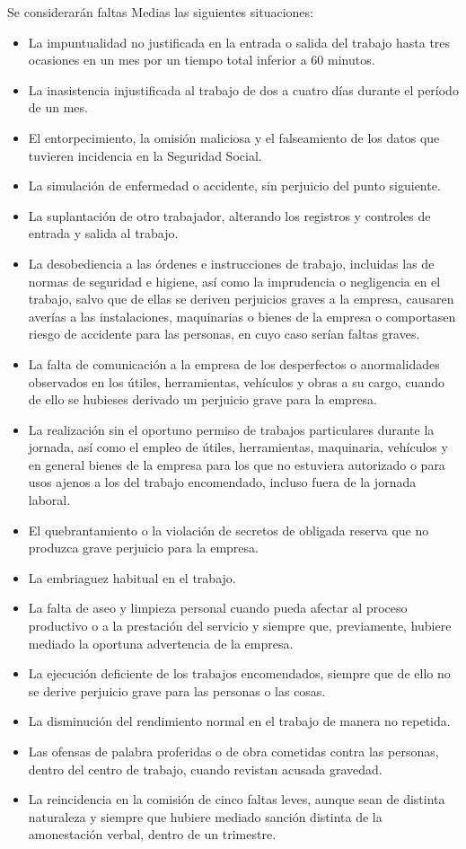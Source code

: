 \documentclass[11pt,bibtotoc,noliststotoc,BCOR0mm]{scrbook}
\begin{document}
Se considerarán faltas Medias las siguientes situaciones:
\begin{itemize}
\item La impuntualidad no justificada en la entrada o salida del trabajo hasta tres ocasiones en un mes por un tiempo total inferior a 60 minutos.
\item La inasistencia injustificada al trabajo de dos a cuatro días durante el período de un mes.
\item El entorpecimiento, la omisión maliciosa y el falseamiento de los datos que tuvieren incidencia en la Seguridad Social.
\item La simulación de enfermedad o accidente, sin perjuicio del punto siguiente.
\item La suplantación de otro trabajador, alterando los registros y controles de entrada y salida al trabajo.
\item La desobediencia a las órdenes e instrucciones de trabajo, incluidas las de normas de seguridad e higiene, así como la imprudencia o negligencia en el trabajo, salvo que de ellas se deriven perjuicios graves a la empresa, causaren averías a las instalaciones, maquinarias o bienes de la empresa o comportasen riesgo de accidente para las personas, en cuyo caso serían faltas graves.
\item La falta de comunicación a la empresa de los desperfectos o anormalidades observados en los útiles, herramientas, vehículos y obras a su cargo, cuando de ello se hubieses derivado un perjuicio grave para la empresa.
\item La realización sin el oportuno permiso de trabajos particulares durante la jornada, así como el empleo de útiles, herramientas, maquinaria, vehículos y en general bienes de la empresa para los que no estuviera autorizado o para usos ajenos a los del trabajo encomendado, incluso fuera de la jornada laboral.
\item El quebrantamiento o la violación de secretos de obligada reserva que no produzca grave perjuicio para la empresa.
\item La embriaguez habitual en el trabajo.
\item La falta de aseo y limpieza personal cuando pueda afectar al proceso productivo o a la prestación del servicio y siempre que, previamente, hubiere mediado la oportuna advertencia de la empresa.
\item La ejecución deficiente de los trabajos encomendados, siempre que de ello no se derive perjuicio grave para las personas o las cosas.
\item La disminución del rendimiento normal en el trabajo de manera no repetida.
\item Las ofensas de palabra proferidas o de obra cometidas contra las personas, dentro del centro de trabajo, cuando revistan acusada gravedad.
\item La reincidencia en la comisión de cinco faltas leves, aunque sean de distinta naturaleza y siempre que hubiere mediado sanción distinta de la amonestación verbal, dentro de un trimestre.
\end{itemize}
\end{document}
